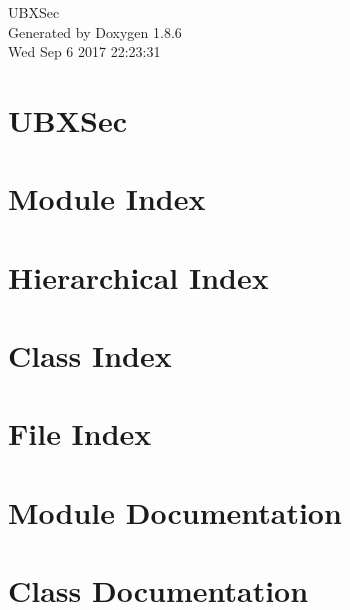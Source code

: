 \documentclass[twoside]{book}
\newcommand{\clearemptydoublepage}{%
  \newpage{\pagestyle{empty}\cleardoublepage}%
}
\begin{document}
\hypersetup{pageanchor=false}
\begin{titlepage}
\vspace*{7cm}
\begin{center}%
{\Large U\-B\-X\-Sec }\\
\vspace*{1cm}
{\large Generated by Doxygen 1.8.6}\\
\vspace*{0.5cm}
{\small Wed Sep 6 2017 22:23:31}\\
\end{center}
\end{titlepage}
\clearemptydoublepage
\tableofcontents
\clearemptydoublepage
{}
\hypersetup{pageanchor=true}

\chapter{U\-B\-X\-Sec}
\label{md__home_travis_build_marcodeltutto_UBXSec_README}
\hypertarget{md__home_travis_build_marcodeltutto_UBXSec_README}{}

\chapter{Module Index}

\chapter{Hierarchical Index}

\chapter{Class Index}

\chapter{File Index}

\chapter{Module Documentation}


\chapter{Class Documentation}




























\end{document}
